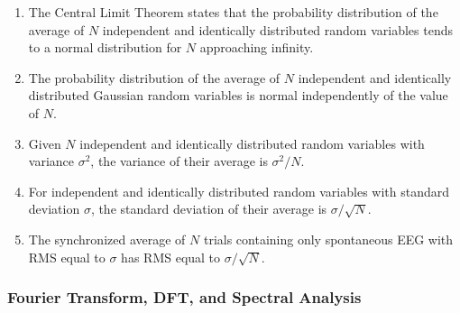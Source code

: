 \begin{enumerate}[label=\arabic*.]
    \item The Central Limit Theorem states that the probability distribution of the average of $N$ independent and identically distributed random variables tends to a normal distribution for $N$ approaching infinity.
    
    \item The probability distribution of the average of $N$ independent and identically distributed Gaussian random variables is normal independently of the value of $N$.
    
    \item Given $N$ independent and identically distributed random variables with variance $\sigma^2$, the variance of their average is $\sigma^2/N$.
    
    \item For independent and identically distributed random variables with standard deviation $\sigma$, the standard deviation of their average is $\sigma/\sqrt{N}$.
    
    \item The synchronized average of $N$ trials containing only spontaneous EEG with RMS equal to $\sigma$ has RMS equal to $\sigma/\sqrt{N}$.
\end{enumerate}

\subsubsection{Fourier Transform, DFT, and Spectral Analysis}

